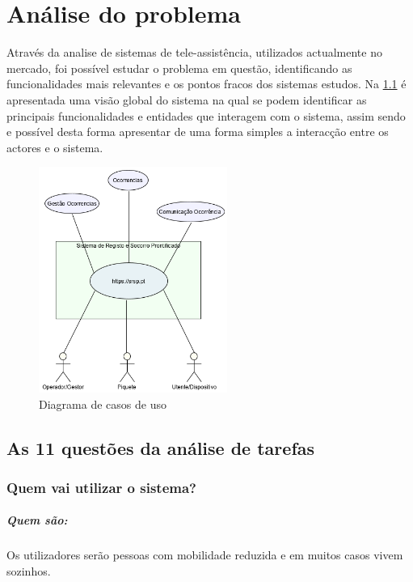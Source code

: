 \chapter{Análise do problema}
\label{cap2}

Através da analise de sistemas de tele-assistência, utilizados actualmente no mercado, foi possível estudar o problema em questão, identificando as funcionalidades mais relevantes e os pontos fracos dos sistemas estudos. Na \ref{fig:cenario_global} é apresentada uma visão global do sistema na qual se podem identificar as principais funcionalidades e entidades que interagem com o sistema, assim sendo e possível desta forma apresentar de uma forma simples a interacção entre os actores e o sistema.

\begin{figure}[!htb]
	\centering
	\includegraphics[width=0.55\textwidth]{figuras/cenario_global_sistema.png}
	\caption{Diagrama de casos de uso}
	\label{fig:cenario_global}
\end{figure}

\section{As 11 questões da análise de tarefas}

\subsection{Quem vai utilizar o sistema?}
\paragraph{Quem são:}Os utilizadores serão pessoas com mobilidade reduzida e em muitos casos vivem sozinhos.

